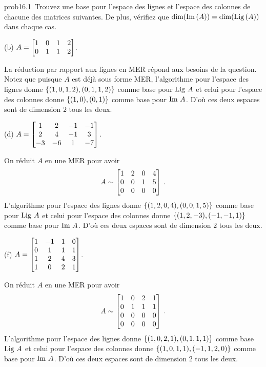 
\begin{sol}{prob16.1}~Trouvez une base pour l'espace des lignes et l'espace des colonnes de chacune des matrices suivantes. De plus, vérifiez que $\dim(\operatorname{Im}\,(A)) = \dim(\operatorname{Lig\,}(A))$ dans chaque cas.
\medskip

(b) 
$A=\bmatrix 1&0&1&2\cr 0&1&1&2\endbmatrix $.

\soln La réduction par rapport aux lignes en MER r\'epond aux besoins de la question. Notez que puisque $A$ est déjà sous forme MER, l'algorithme pour l'espace des lignes donne $\{(1,0,1,2),(0,1,1,2)\}$ comme base pour $\operatorname{Lig\,} A$ et celui pour l'espace des colonnes donne $ \{(1,0),(0,1)\}$ comme base pour $\operatorname{Im}\, A$. D'où ces deux espaces sont de dimension $2$ tous les deux.
\medskip 

(d) $A=\bmatrix 1&2&-1&-1\\2&4&-1&3\\ -3&-6&1&-7\endbmatrix$.

\soln On r\'eduit $A$ en une MER pour avoir $$A\sim \bmatrix 1 & 2 & 0 & 4 \\
 0 & 0 & 1 & 5 \\
 0 & 0 & 0 & 0 \endbmatrix\,.$$ 
 L'algorithme pour l'espace des lignes donne $\{(1,2,0,4),(0,0,1,5)\}$ comme base pour $\operatorname{Lig\,} A$ et celui pour l'espace des colonnes donne  $ \{(1,2,-3),(-1,-1,1)\}$ comme base pour $\operatorname{Im}\, A$.  D'où ces deux espaces sont de dimension $2$ tous les deux.
\medskip

(f) $A=\bmatrix 1 & -1 & 1 & 0 \\
 0 & 1 & 1 & 1 \\
 1 & 2 & 4 & 3 \\
 1 & 0 & 2 & 1\endbmatrix$.

\soln On r\'eduit $A$ en une MER pour avoir 
$$A\sim \bmatrix 1 & 0 & 2 & 1 \\
 0 & 1 & 1 & 1 \\
 0 & 0 & 0 & 0 \\
 0 & 0 & 0 & 0  \endbmatrix\,.$$ 
 L'algorithme pour l'espace des lignes donne  $\{(1,0,2,1),(0,1,1,1)\}$ comme base $\operatorname{Lig\,} A$ et celui pour l'espace des colonnes donne  $ \{(1,0,1,1),(-1,1,2,0)\}$ comme base pour $\operatorname{Im}\,  A$. D'où ces deux espaces sont de dimension $2$ tous les deux.\medskip


\end{sol}

